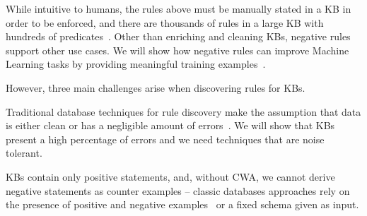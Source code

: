 While intuitive to humans, the rules above must be manually stated in a KB in order to be enforced, and there are thousands of rules in a large KB with hundreds of predicates~\cite{gc2015big}. Other than enriching and cleaning KBs, negative rules support other use cases. %
We will show how negative rules 
can improve Machine Learning tasks by providing meaningful training examples~\cite{richardson2006markov,shin2015incremental}.


\vspace{1mm}
However, %
three main challenges arise when discovering rules for KBs.

Traditional database techniques for rule discovery make the assumption that data is either clean or has a negligible amount of errors~\cite{abiteboul1995foundations,huhtala1999tane,wyss2001fastfds,chu2013discovering}. We will show that KBs present a high percentage of errors and we need techniques that are noise tolerant.

KBs contain only positive statements, and, without CWA, we cannot derive negative statements as counter examples --  classic databases approaches rely on the presence of positive and negative examples~\cite{dehaspe1999discovery,muggleton1994inductive} or a fixed schema given as input.  


